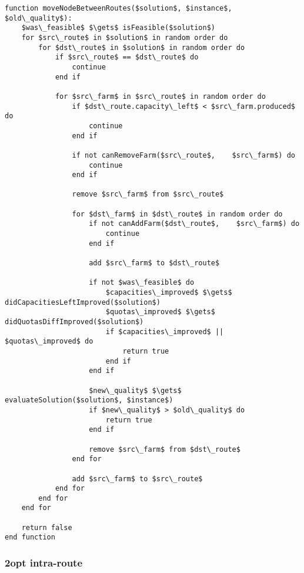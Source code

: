\begin{lstlisting}[style=estiloPseudocodigo]
function moveNodeBetweenRoutes($solution$, $instance$, $old\_quality$):
    $was\_feasible$ $\gets$ isFeasible($solution$)
    for $src\_route$ in $solution$ in random order do
        for $dst\_route$ in $solution$ in random order do
            if $src\_route$ == $dst\_route$ do
                continue
            end if
            
            for $src\_farm$ in $src\_route$ in random order do
                if $dst\_route.capacity\_left$ < $src\_farm.produced$ do
                    continue
                end if

                if not canRemoveFarm($src\_route$,    $src\_farm$) do
                    continue
                end if

                remove $src\_farm$ from $src\_route$

                for $dst\_farm$ in $dst\_route$ in random order do
                    if not canAddFarm($dst\_route$,    $src\_farm$) do
                        continue
                    end if

                    add $src\_farm$ to $dst\_route$
                    
                    if not $was\_feasible$ do
                        $capacities\_improved$ $\gets$ didCapacitiesLeftImproved($solution$)
                        $quotas\_improved$ $\gets$ didQuotasDiffImproved($solution$)
                        if $capacities\_improved$ || $quotas\_improved$ do
                            return true
                        end if
                    end if

                    $new\_quality$ $\gets$ evaluateSolution($solution$, $instance$)
                    if $new\_quality$ > $old\_quality$ do
                        return true
                    end if

                    remove $src\_farm$ from $dst\_route$
                end for

                add $src\_farm$ to $src\_route$
            end for
        end for
    end for

    return false
end function
\end{lstlisting}

\subsubsection{2opt intra-route}


